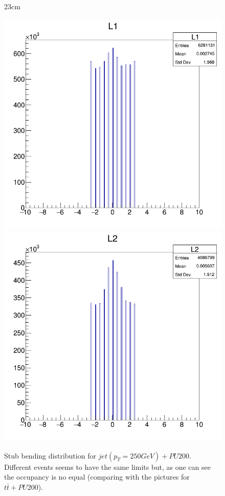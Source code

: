 \begin{landscape}
	\begin{figure}[htbp]{23cm}
		\caption{Stub bending distribution for $jet(p_{T}=250GeV)+PU200$. Different events seems to have the same limits but, as one can see the occupancy is no equal (comparing with the pictures for $t\bar{t}+PU200$).}
		\centering
		\includegraphics[scale=0.26]{AppendixCMSL1TT/figs/JetPt250_PU200_deltaS_l1}
		\includegraphics[scale=0.26]{AppendixCMSL1TT/figs/JetPt250_PU200_deltaS_l2}

\end{figure}
\end{landscape}
